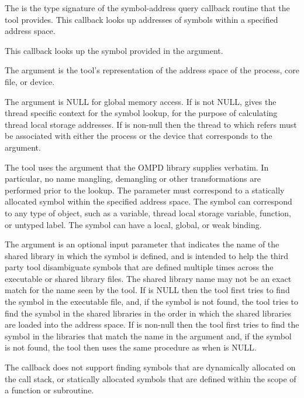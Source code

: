 \descr
The  is the type signature of the 
symbol-address query callback routine that the tool provides. This callback 
looks up addresses of symbols within a specified address space.

\argdesc
This callback looks up the symbol provided in the  argument.

The  argument is the tool's representation of the 
address space of the process, core file, or device.

The  argument is NULL for global memory access. If  
 is not NULL,  gives the thread specific 
context for the symbol lookup, for the purpose of calculating thread local 
storage addresses. If  is non-null then the thread 
to which  refers must be associated with either the process 
or the device that corresponds to the  argument.

The tool uses the  argument that the OMPD library supplies 
verbatim. In particular, no name mangling, demangling or other transformations 
are performed prior to the lookup. The  parameter must correspond
to a statically allocated symbol within the specified address space. The symbol 
can correspond to any type of object, such as a variable, thread local storage 
variable, function, or untyped label. The symbol can have a local, global, or 
weak binding.

The  argument is an optional input parameter that indicates the 
name of the shared library in which the symbol is defined, and is intended to 
help the third party tool disambiguate symbols that are defined multiple times 
across the executable or shared library files. The shared library name may not 
be an exact match for the name seen by the tool. If  is NULL then
the tool first tries to find the symbol in the executable file, and, if the 
symbol is not found, the tool tries to find the symbol in the shared libraries 
in the order in which the shared libraries are loaded into the address space. 
If  is non-null then the tool first tries to find the symbol in 
the libraries that match the name in the  argument and, if the 
symbol is not found, the tool then uses the same procedure as when 
 is NULL.

The callback does not support finding symbols that are dynamically allocated on 
the call stack, or statically allocated symbols that are defined within the scope 
of a function or subroutine.

